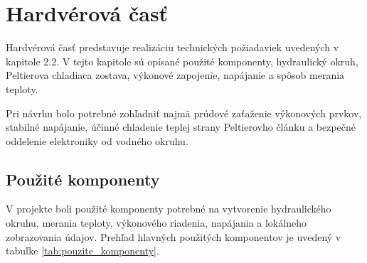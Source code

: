 
\section{Hardvérová časť}

Hardvérová časť predstavuje realizáciu technických požiadaviek uvedených v kapitole 2.2. 
V tejto kapitole sú opísané použité komponenty, hydraulický okruh, 
Peltierova chladiaca zostava, výkonové zapojenie, napájanie a spôsob merania teploty.

Pri návrhu bolo potrebné zohľadniť najmä prúdové zaťaženie výkonových prvkov, 
stabilné napájanie, účinné chladenie teplej strany Peltierovho článku a 
bezpečné oddelenie elektroniky od vodného okruhu.

\subsection{Použité komponenty}

V projekte boli použité komponenty potrebné na vytvorenie hydraulického okruhu, 
merania teploty, výkonového riadenia, napájania a lokálneho zobrazovania údajov. 
Prehľad hlavných použitých komponentov je uvedený v tabuľke \ref{tab:pouzite_komponenty}.


